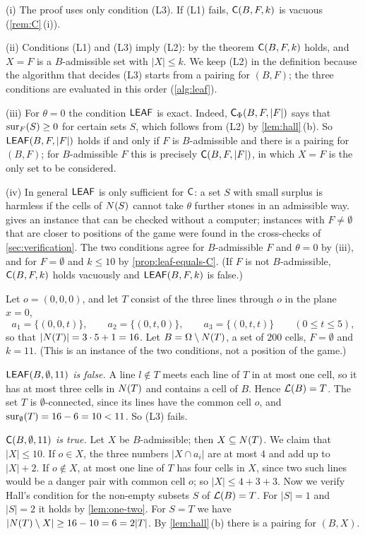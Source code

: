 \begin{remark}\label{rem:leaf}
(i) The proof uses only condition (L3). If (L1) fails, $\mathsf{C}(B,F,k)$ is vacuous (\cref{rem:C}\,(i)).

(ii) Conditions (L1) and (L3) imply (L2): by the theorem $\mathsf{C}(B,F,k)$ holds, and $X=F$ is a $B$-admissible
set with $|X|\le k$. We keep (L2) in the definition because the algorithm that decides (L3) starts from a
pairing for $(B,F)$; the three conditions are evaluated in this order (\cref{alg:leaf}).

(iii) For $\theta=0$ the condition $\mathsf{LEAF}$ is exact. Indeed, $\mathsf{C}_\Phi(B,F,|F|)$ says that $\operatorname{sur}_F(S)\ge 0$ for
certain sets $S$, which follows from (L2) by \cref{lem:hall}\,(b). So $\mathsf{LEAF}(B,F,|F|)$ holds if and only if
$F$ is $B$-admissible and there is a pairing for $(B,F)$; for $B$-admissible $F$ this is precisely
$\mathsf{C}(B,F,|F|)$, in which $X=F$ is the only set to be considered.

(iv) In general $\mathsf{LEAF}$ is only sufficient for $\mathsf{C}$: a set $S$ with small surplus is harmless if the
cells of $N(S)$ cannot take $\theta$ further stones in an admissible way.  gives an
instance that can be checked without a computer; instances with $F\ne\emptyset$ that are closer to positions of the
game were found in the cross-checks of \cref{sec:verification}. The two conditions agree for
$B$-admissible $F$ and $\theta=0$ by (iii), and for $F=\emptyset$ and $k\le 10$ by
\cref{prop:leaf-equals-C}. (If $F$ is not $B$-admissible, $\mathsf{C}(B,F,k)$ holds vacuously and $\mathsf{LEAF}(B,F,k)$ is
false.)
\end{remark}

\begin{example}\label{ex:C-not-leaf}
Let $o=(0,0,0)$, and let $T$ consist of the three lines through $o$ in the plane $x=0$,
\[
  a_1=\{(0,0,t)\},\qquad a_2=\{(0,t,0)\},\qquad a_3=\{(0,t,t)\}\qquad(0\le t\le 5),
\]
so that $|N(T)|=3\cdot 5+1=16$. Let $B=\Omega\setminus N(T)$, a set of $200$ cells, $F=\emptyset$ and $k=11$.
(This is an instance of the two conditions, not a position of the game.)

\emph{$\mathsf{LEAF}(B,\emptyset,11)$ is false.} A line $l\notin T$ meets each line of $T$ in at most one cell, so
it has at most three cells in $N(T)$ and contains a cell of $B$. Hence $\mathcal{L}(B)=T$. The set $T$ is
$\emptyset$-connected, since its lines have the common cell $o$, and $\operatorname{sur}_\emptyset(T)=16-6=10<11$. So
(L3) fails.

\emph{$\mathsf{C}(B,\emptyset,11)$ is true.} Let $X$ be $B$-admissible; then $X\subseteq N(T)$. We claim that
$|X|\le 10$. If $o\in X$, the three numbers $|X\cap a_i|$ are at most $4$ and add up to $|X|+2$. If
$o\notin X$, at most one line of $T$ has four cells in $X$, since two such lines would be a danger pair
with common cell $o$; so $|X|\le 4+3+3$. Now we verify Hall's condition for the non-empty subsets $S$ of
$\mathcal{L}(B)=T$. For $|S|=1$ and $|S|=2$ it holds by \cref{lem:one-two}. For $S=T$ we have
$|N(T)\setminus X|\ge 16-10=6=2|T|$. By \cref{lem:hall}\,(b) there is a pairing for $(B,X)$.
\end{example}

